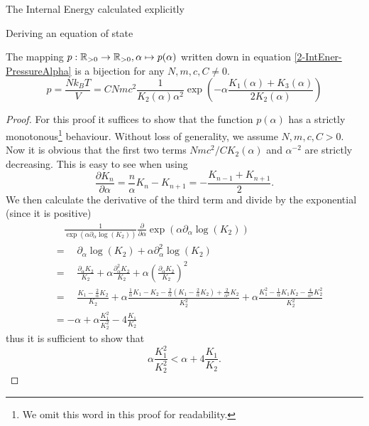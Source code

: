 \begin{section}{The Internal Energy calculated explicitly}
\begin{subsection}{Deriving an equation of state}
\begin{theorem}
	The mapping $p:\mathbb{R}_{>0}\rightarrow \mathbb{R}_{>0},\alpha\mapsto p(\alpha)$ written down in equation \eqref{2-IntEner-PressureAlpha} is a bijection for any $N,m,c,C\neq0$.
	\begin{equation}
		p = \frac{Nk_BT}{V} = CNmc^2\frac{1}{K_2(\alpha)\alpha^2}\exp\left(-\alpha\frac{K_1(\alpha)+K_3(\alpha)}{2K_2(\alpha)}\right)
	\end{equation}
\end{theorem}
\begin{proof}
	For this proof it suffices to show that the function $p(\alpha)$ has a strictly monotonous\footnote{We omit this word in this proof for readability.} behaviour. Without loss of generality, we assume $N,m,c,C>0$. Now it is obvious that the first two terms $Nmc^2/CK_2(\alpha)$ and $\alpha^{-2}$ are strictly decreasing. This is easy to see when using \cite{ModifiedBesselFunction}
	\begin{equation}
		\frac{\partial K_n}{\partial\alpha} = \frac{n}{\alpha}K_n-K_{n+1} = -\frac{K_{n-1}+K_{n+1}}{2}.
		\label{2-IntEner-BesselDerivative}
	\end{equation}
	We then calculate the derivative of the third term and divide by the exponential (since it is positive)
	\begin{align}
		&\hspace{1em} \frac{1}{\exp(\alpha\partial_\alpha\log(K_2))}\frac{\partial}{\partial\alpha}\exp(\alpha\partial_\alpha\log(K_2))\\
		&= \hspace{1em} \partial_\alpha\log(K_2) + \alpha\partial^2_\alpha\log(K_2)\\
		&= \hspace{1em} \frac{\partial_\alpha K_2}{K_2} + \alpha\frac{\partial^2_\alpha K_2}{K_2} + \alpha\left(\frac{\partial_\alpha K_2}{K_2}\right)^2\\
		&= \hspace{1em} \frac{K_1-\frac{2}{\alpha}K_2}{K_2} + \alpha\frac{\frac{1}{\alpha}K_1-K_2-\frac{2}{\alpha}\left(K_1-\frac{2}{\alpha}K_2\right)+\frac{2}{\alpha^2}K_2}{K_2^2} + \alpha\frac{K_1^2-\frac{1}{\alpha}K_1K_2-\frac{4}{\alpha^2}K_2^2}{K_2^2}\\
		&= -\alpha + \alpha\frac{K_1^2}{K_2^2} - 4\frac{K_1}{K_2}
	\end{align}
	thus it is sufficient to show that
	\begin{equation}
		\alpha\frac{K_1^2}{K_2^2}  < \alpha + 4\frac{K_1}{K_2}.
	\end{equation}

\end{proof}
\end{subsection}
\end{section}
